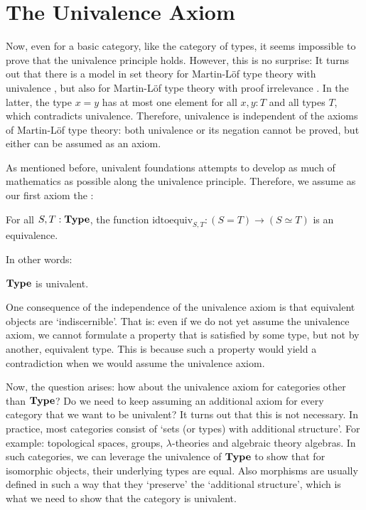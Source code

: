 \section{The Univalence Axiom}\label{sec:univalence-axiom}
Now, even for a basic category, like the category of types, it seems impossible to prove that the univalence principle holds. However, this is no surprise: It turns out that there is a model in set theory for Martin-Löf type theory with univalence \autocite{simplicial-set-model}, but also for Martin-Löf type theory with proof irrelevance \autocite{proof-irrelevant-model}. In the latter, the type $ x = y $ has at most one element for all $ x, y : T $ and all types $ T $, which contradicts univalence. Therefore, univalence is independent of the axioms of Martin-Löf type theory: both univalence or its negation cannot be proved, but either can be assumed as an axiom.

As mentioned before, univalent foundations attempts to develop as much of mathematics as possible along the univalence principle. Therefore, we assume as our first axiom the :
\begin{axiom}
  For all $ S, T: \mathbf{Type} $, the function $ \mathrm{idtoequiv}_{S, T}: (S = T) \to (S \simeq T) $ is an equivalence.
\end{axiom}
In other words:
\begin{axiom}
  $ \mathbf{Type} $ is univalent.
\end{axiom}

\begin{remark}
  One consequence of the independence of the univalence axiom is that equivalent objects are `indiscernible'. That is: even if we do not yet assume the univalence axiom, we cannot formulate a property that is satisfied by some type, but not by another, equivalent type. This is because such a property would yield a contradiction when we would assume the univalence axiom.
\end{remark}

Now, the question arises: how about the univalence axiom for categories other than $ \mathbf{Type} $? Do we need to keep assuming an additional axiom for every category that we want to be univalent? It turns out that this is not necessary. In practice, most categories consist of `sets (or types) with additional structure'. For example: topological spaces, groups, $ \lambda $-theories and algebraic theory algebras. In such categories, we can leverage the univalence of $ \mathbf{Type} $ to show that for isomorphic objects, their underlying types are equal. Also morphisms are usually defined in such a way that they `preserve' the `additional structure', which is what we need to show that the category is univalent.

